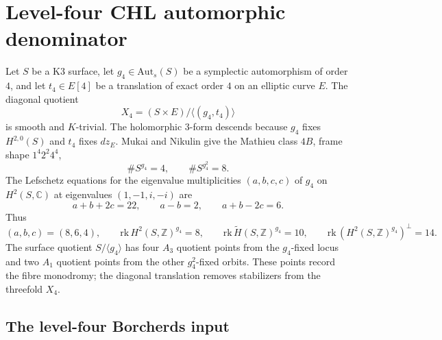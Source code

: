 
\providecommand{\kBKM}{\kappa_{\mathrm{BKM}}}
\providecommand{\kch}{\kappa_{\mathrm{ch}}}
\providecommand{\kcat}{\kappa_{\mathrm{cat}}}
\providecommand{\kfib}{\kappa_{\mathrm{fiber}}}
\providecommand{\Z}{\mathbb{Z}}
\providecommand{\C}{\mathbb{C}}
\providecommand{\cO}{\mathcal{O}}
\providecommand{\DTred}{Z^{\mathrm{red}}_{\mathrm{DT}}}
\providecommand{\mult}{\mathrm{mult}}
\providecommand{\smult}{\operatorname{smult}}
\providecommand{\wt}{\operatorname{wt}}
\providecommand{\Hup}{\mathbb H_2}
\providecommand{\Hdiag}{\mathcal H_{\mathrm{diag}}}
\providecommand{\PhiFour}{\Phi_4}
\providecommand{\DeltaFour}{\Delta^{(4)}_2}
\providecommand{\DeltaOneFour}{\Delta_{1,4}}
\providecommand{\NablaThreeHalf}{\nabla_{3/2}}
\providecommand{\gPhiFour}{\mathfrak{g}_{\Phi_4}}

\section*{Level-four CHL automorphic denominator}
\label{wn:sec:N4-automorphic-denominator}

Let $S$ be a K3 surface, let $g_4\in\mathrm{Aut}_s(S)$ be a symplectic
automorphism of order $4$, and let $t_4\in E[4]$ be a translation of
exact order $4$ on an elliptic curve $E$. The diagonal quotient
\[
  X_4=(S\times E)/\langle(g_4,t_4)\rangle
\]
is smooth and $K$-trivial. The holomorphic $3$-form descends because
$g_4$ fixes $H^{2,0}(S)$ and $t_4$ fixes $dz_E$. Mukai and Nikulin give
the Mathieu class $4B$, frame shape $1^4 2^2 4^4$,
\[
  \#S^{g_4}=4,\qquad
  \#S^{g_4^2}=8.
\]
The Lefschetz equations for the eigenvalue multiplicities
$(a,b,c,c)$ of $g_4$ on $H^2(S,\C)$ at eigenvalues
$(1,-1,i,-i)$ are
\[
  a+b+2c=22,\qquad a-b=2,\qquad a+b-2c=6.
\]
Thus
\[
  (a,b,c)=(8,6,4),\qquad
  \mathrm{rk}\,H^2(S,\Z)^{g_4}=8,\qquad
  \mathrm{rk}\,\widetilde H(S,\Z)^{g_4}=10,\qquad
  \mathrm{rk}\,(H^2(S,\Z)^{g_4})^\perp=14.
\]
The surface quotient $S/\langle g_4\rangle$ has four $A_3$ quotient
points from the $g_4$-fixed locus and two $A_1$ quotient points from
the other $g_4^2$-fixed orbits. These points record the fibre
monodromy; the diagonal translation removes stabilizers from the
threefold $X_4$.

\subsection*{The level-four Borcherds input}

